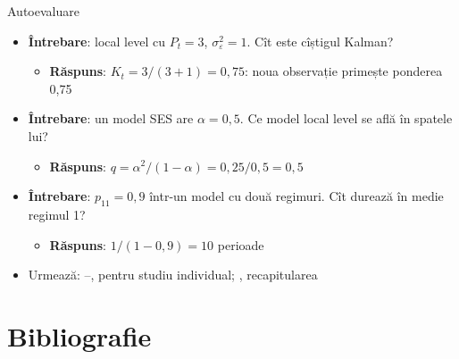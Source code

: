 \begin{frame}{Autoevaluare}
\itemsize{\small}
\begin{itemize}
    \item \textbf{Întrebare}: local level cu $P_t = 3$, $\sigma^2_\varepsilon = 1$. Cît este cîștigul Kalman?
    \begin{itemize}
        \item \textbf{Răspuns}: $K_t = 3/(3 + 1) = 0{,}75$: noua observație primește ponderea 0,75
    \end{itemize}
    \item \textbf{Întrebare}: un model SES are $\alpha = 0{,}5$. Ce model local level se află în spatele lui?
    \begin{itemize}
        \item \textbf{Răspuns}: $q = \alpha^2/(1 - \alpha) = 0{,}25/0{,}5 = 0{,}5$
    \end{itemize}
    \item \textbf{Întrebare}: $p_{11} = 0{,}9$ într-un model cu două regimuri. Cît durează în medie regimul 1?
    \begin{itemize}
        \item \textbf{Răspuns}: $1/(1 - 0{,}9) = 10$ perioade
    \end{itemize}
    \item Urmează: --, pentru studiu individual; , recapitularea
\end{itemize}
\end{frame}


\section{Bibliografie}

